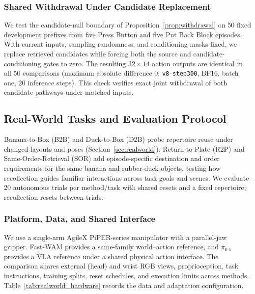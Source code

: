 

\subsubsection{Shared Withdrawal Under Candidate Replacement}
\label{app:gate_probes}

We test the candidate-null boundary of Proposition~\ref{prop:withdrawal} on 50 fixed development prefixes from five Press Button and five Put Back Block episodes.
With current inputs, sampling randomness, and conditioning masks fixed, we replace retrieved candidates while forcing both the source and candidate-conditioning gates to zero.
The resulting $32\times14$ action outputs are identical in all 50 comparisons (maximum absolute difference 0; \texttt{v8-step300}, BF16, batch one, 20 inference steps).
This check verifies exact joint withdrawal of both candidate pathways under matched inputs.
\subsection{Real-World Tasks and Evaluation Protocol}
\label{app:realworld}

Banana-to-Box (B2B) and Duck-to-Box (D2B) probe repertoire reuse under changed layouts and poses (Section~\ref{sec:realworld}).
Return-to-Plate (R2P) and Same-Order-Retrieval (SOR) add episode-specific destination and order requirements for the same banana and rubber-duck objects, testing how recollection guides familiar interactions across task goals and scenes.
We evaluate 20 autonomous trials per method/task with shared resets and a fixed repertoire; recollection resets between trials.

\subsubsection{Platform, Data, and Shared Interface}
\label{app:realworld_hardware}

We use a single-arm AgileX PiPER-series manipulator with a parallel-jaw gripper.
Fast-WAM provides a same-family world--action reference, and $\pi_{0.5}$ provides a VLA reference under a shared physical action interface.
The comparison shares external (head) and wrist RGB views, proprioception, task instructions, training splits, reset schedules, and execution limits across methods.
Table~\ref{tab:realworld_hardware} records the data and adaptation configuration.

